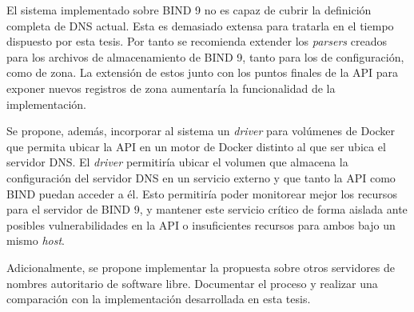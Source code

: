 \begin{recomendations}
El sistema implementado sobre BIND 9 no es capaz de cubrir la definición completa de DNS actual. Esta es demasiado extensa para tratarla en el tiempo dispuesto por esta tesis. Por tanto se recomienda extender los \textit{parsers} creados para los archivos de almacenamiento de BIND 9, tanto para los de configuración, como de zona. La extensión de estos junto con los puntos finales de la API para exponer nuevos registros de zona aumentaría la funcionalidad de la implementación.

Se propone, además, incorporar al sistema un \textit{driver} para volúmenes de Docker que permita ubicar la API en un motor de Docker distinto al que ser ubica el servidor DNS. El \textit{driver} permitiría ubicar el volumen que almacena la configuración del servidor DNS en un servicio externo y que tanto la API como BIND puedan acceder a él. Esto permitiría poder monitorear mejor los recursos para el servidor de BIND 9, y mantener este servicio crítico de forma aislada ante posibles vulnerabilidades en la API o insuficientes recursos para ambos bajo un mismo \textit{host}.

Adicionalmente, se propone implementar la propuesta sobre otros servidores de nombres autoritario de software libre. Documentar el proceso y realizar una comparación con la implementación desarrollada en esta tesis. 
\end{recomendations}
